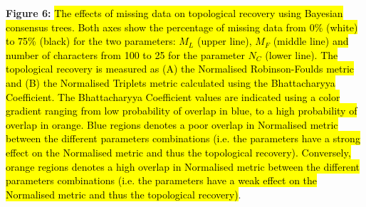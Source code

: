 \documentclass[12pt,letterpaper]{article}
\begin{document}
\bigskip
\noindent
\textbf{Figure 6:} \hl{The effects of missing data on topological recovery using Bayesian consensus trees. Both axes show the percentage of missing data from 0\% (white) to 75\% (black) for the two parameters: $M_{L}$ (upper line), $M_{F}$ (middle line) and number of characters from 100 to 25 for the parameter $N_{C}$ (lower line). The topological recovery is measured as (A) the Normalised Robinson-Foulds metric and (B) the Normalised Triplets metric calculated using the Bhattacharyya Coefficient. The Bhattacharyya Coefficient values are indicated using a color gradient ranging from low probability of overlap in blue, to a high probability of overlap in orange. Blue regions denotes a poor overlap in Normalised metric between the different parameters combinations (i.e. the parameters have a strong effect on the Normalised metric and thus the topological recovery). Conversely, orange regions denotes a high overlap in Normalised metric between the different parameters combinations (i.e. the parameters have a weak effect on the Normalised metric and thus the topological recovery)}.
\end{document}
